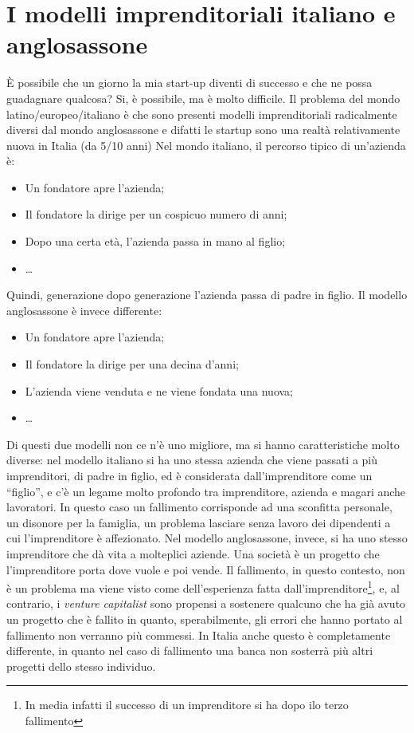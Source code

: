\section{I modelli imprenditoriali italiano e anglosassone}
È possibile che un giorno la mia start-up diventi di successo e che ne possa
guadagnare qualcosa? Si, è possibile, ma è molto difficile.
Il problema del mondo latino/europeo/italiano è che sono presenti modelli
imprenditoriali radicalmente diversi dal mondo anglosassone e difatti
le startup sono una realtà relativamente nuova in Italia (da 5/10 anni)
Nel mondo italiano, il percorso tipico di un'azienda è:
\begin{itemize}
 \item Un fondatore apre l'azienda;
 \item Il fondatore la dirige per un cospicuo numero di anni;
 \item Dopo una certa età, l'azienda passa in mano al figlio;
 \item \dots
\end{itemize}
Quindi, generazione dopo generazione l'azienda passa di padre in figlio.
Il modello anglosassone è invece differente:
\begin{itemize}
 \item Un fondatore apre l'azienda;
 \item Il fondatore la dirige per una decina d'anni;
 \item L'azienda viene venduta e ne viene fondata una nuova;
 \item \dots
\end{itemize}
Di questi due modelli non ce n'è uno migliore, ma si hanno caratteristiche
molto diverse: nel modello italiano si ha uno stessa azienda che viene passati
a più imprenditori, di padre in figlio, ed è considerata dall'imprenditore come
un ``figlio'', e c'è un legame molto profondo tra imprenditore, azienda e
magari anche lavoratori. In questo caso un fallimento corrisponde ad una
sconfitta personale, un disonore per la famiglia, un problema lasciare senza
lavoro dei dipendenti a cui l'imprenditore è affezionato. Nel modello
anglosassone, invece, si ha uno stesso imprenditore che dà vita a molteplici
aziende. Una società è un progetto che l'imprenditore porta dove vuole e poi
vende. Il fallimento, in questo contesto, non è un problema ma viene visto come
dell'esperienza fatta dall'imprenditore\footnote{In media infatti il successo
di un imprenditore si ha dopo ilo terzo fallimento}, e, al contrario, i 
\textit{venture capitalist} sono propensi a sostenere qualcuno che ha già avuto
un progetto che è fallito in quanto, sperabilmente, gli errori che hanno
portato al fallimento non verranno più commessi. In Italia anche questo è
completamente differente, in quanto nel caso di fallimento una banca non
sosterrà più altri progetti dello stesso individuo.